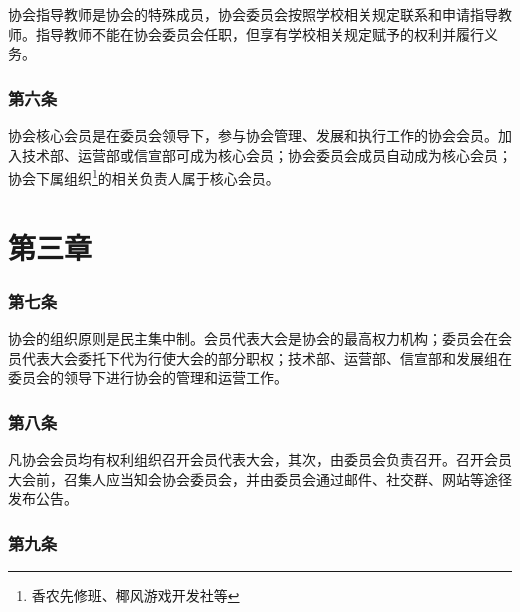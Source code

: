 \documentclass[
]{ctexart}
\begin{document}
协会指导教师是协会的特殊成员，协会委员会按照学校相关规定联系和申请指导教师。指导教师不能在协会委员会任职，但享有学校相关规定赋予的权利并履行义务。

\hypertarget{ux7b2cux516dux6761-ux6838ux5fc3ux4f1aux5458}{%
\subsubsection{第六条}\label{ux7b2cux516dux6761-ux6838ux5fc3ux4f1aux5458}}

协会核心会员是在委员会领导下，参与协会管理、发展和执行工作的协会会员。加入技术部、运营部或信宣部可成为核心会员；协会委员会成员自动成为核心会员；协会下属组织\footnote{香农先修班、椰风游戏开发社等}的相关负责人属于核心会员。

\hypertarget{ux7b2cux4e09ux7ae0-ux7ec4ux7ec7ux4e0eux7ba1ux7406}{%
\section{第三章}\label{ux7b2cux4e09ux7ae0-ux7ec4ux7ec7ux4e0eux7ba1ux7406}}

\hypertarget{ux7b2cux4e03ux6761-ux7ba1ux7406ux5236ux5ea6}{%
\subsubsection{第七条}\label{ux7b2cux4e03ux6761-ux7ba1ux7406ux5236ux5ea6}}

协会的组织原则是民主集中制。会员代表大会是协会的最高权力机构；委员会在会员代表大会委托下代为行使大会的部分职权；技术部、运营部、信宣部和发展组在委员会的领导下进行协会的管理和运营工作。

\hypertarget{ux7b2cux516bux6761-ux4f1aux5458ux4ee3ux8868ux5927ux4f1a}{%
\subsubsection{第八条}\label{ux7b2cux516bux6761-ux4f1aux5458ux4ee3ux8868ux5927ux4f1a}}

凡协会会员均有权利组织召开会员代表大会，其次，由委员会负责召开。召开会员大会前，召集人应当知会协会委员会，并由委员会通过邮件、社交群、网站等途径发布公告。

\hypertarget{ux7b2cux4e5dux6761-ux53ecux5f00ux5927ux4f1aux7684ux8981ux6c42}{%
\subsubsection{第九条}\label{ux7b2cux4e5dux6761-ux53ecux5f00ux5927ux4f1aux7684ux8981ux6c42}}
\end{document}
